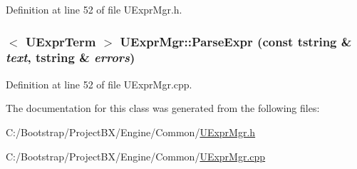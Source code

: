 Definition at line 52 of file UExprMgr.h.\hypertarget{class_u_expr_mgr_a6d17d391282f2b68c8ce92af1d0b204}{
\subsubsection[{ParseExpr}]{$<$ {\bf UExprTerm} $>$ UExprMgr::ParseExpr (const {\bf tstring} \& {\em text}, \/  {\bf tstring} \& {\em errors})}}
\label{class_u_expr_mgr_a6d17d391282f2b68c8ce92af1d0b204}




Definition at line 52 of file UExprMgr.cpp.

The documentation for this class was generated from the following files:\begin{CompactItemize}
\item 
C:/Bootstrap/ProjectBX/Engine/Common/\hyperlink{_u_expr_mgr_8h}{UExprMgr.h}\item 
C:/Bootstrap/ProjectBX/Engine/Common/\hyperlink{_u_expr_mgr_8cpp}{UExprMgr.cpp}\end{CompactItemize}
